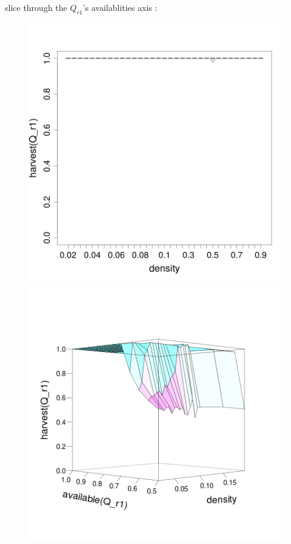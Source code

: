 \documentclass[8pt, handout=show,notes=show]{beamer}
\begin{document}
\begin{frame}{slice through the $Q_{r1}$'s availablities axis : }
\begin{figure}[H]
\includegraphics[width=\imgSize]{images/harvestr1_density_r1-90.png}
\includegraphics[width=\imgSize]{images/R1_median}
\end{figure}
\end{frame}
\end{document}
